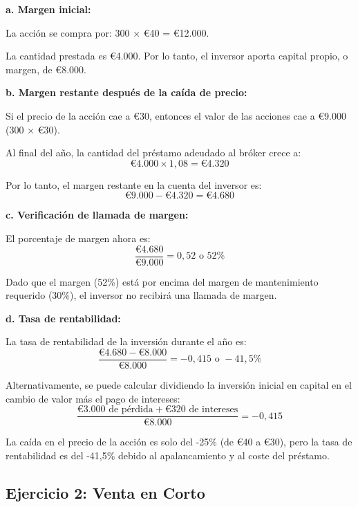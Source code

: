 \begin{solucion}[Ejercicio 1]
\textbf{a. Margen inicial:}

La acción se compra por: 300 × €40 = €12.000.

La cantidad prestada es €4.000. Por lo tanto, el inversor aporta capital propio, o margen, de €8.000.

\textbf{b. Margen restante después de la caída de precio:}

Si el precio de la acción cae a €30, entonces el valor de las acciones cae a €9.000 (300 × €30).

Al final del año, la cantidad del préstamo adeudado al bróker crece a:
\begin{equation}
€4.000 \times 1,08 = €4.320
\end{equation}

Por lo tanto, el margen restante en la cuenta del inversor es:
\begin{equation}
€9.000 - €4.320 = €4.680
\end{equation}

\textbf{c. Verificación de llamada de margen:}

El porcentaje de margen ahora es:
\begin{equation}
\frac{€4.680}{€9.000} = 0,52 \text{ o } 52\%
\end{equation}

Dado que el margen (52\%) está por encima del margen de mantenimiento requerido (30\%), el inversor no recibirá una llamada de margen.

\textbf{d. Tasa de rentabilidad:}

La tasa de rentabilidad de la inversión durante el año es:
\begin{equation}
\frac{€4.680 - €8.000}{€8.000} = -0,415 \text{ o } -41,5\%
\end{equation}

Alternativamente, se puede calcular dividiendo la inversión inicial en capital en el cambio de valor más el pago de intereses:
\begin{equation}
\frac{€3.000 \text{ de pérdida} + €320 \text{ de intereses}}{€8.000} = -0,415
\end{equation}

La caída en el precio de la acción es solo del -25\% (de €40 a €30), pero la tasa de rentabilidad es del -41,5\% debido al apalancamiento y al coste del préstamo.
\end{solucion}

\subsection{Ejercicio 2: Venta en Corto}

